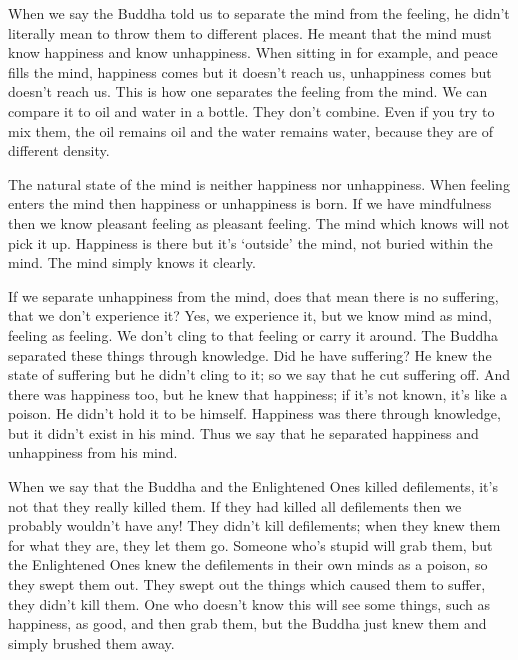 When we say the Buddha told us to separate the mind from the feeling, he didn't literally mean to throw them to different places. He meant that the mind must know happiness and know unhappiness. When sitting in  for example, and peace fills the mind, happiness comes but it doesn't reach us, unhappiness comes but doesn't reach us. This is how one separates the feeling from the mind. We can compare it to oil and water in a bottle. They don't combine. Even if you try to mix them, the oil remains oil and the water remains water, because they are of different density. 

The natural state of the mind is neither happiness nor unhappiness. When feeling enters the mind then happiness or unhappiness is born. If we have mindfulness then we know pleasant feeling as pleasant feeling. The mind which knows will not pick it up. Happiness is there but it's `outside' the mind, not buried within the mind. The mind simply knows it clearly. 

If we separate unhappiness from the mind, does that mean there is no suffering, that we don't experience it? Yes, we experience it, but we know mind as mind, feeling as feeling. We don't cling to that feeling or carry it around. The Buddha separated these things through knowledge. Did he have suffering? He knew the state of suffering but he didn't cling to it; so we say that he cut suffering off. And there was happiness too, but he knew that happiness; if it's not known, it's like a poison. He didn't hold it to be himself. Happiness was there through knowledge, but it didn't exist in his mind. Thus we say that he separated happiness and unhappiness from his mind. 

When we say that the Buddha and the Enlightened Ones killed defilements, it's not that they really killed them. If they had killed all defilements then we probably wouldn't have any! They didn't kill defilements; when they knew them for what they are, they let them go. Someone who's stupid will grab them, but the Enlightened Ones knew the defilements in their own minds as a poison, so they swept them out. They swept out the things which caused them to suffer, they didn't kill them. One who doesn't know this will see some things, such as happiness, as good, and then grab them, but the Buddha just knew them and simply brushed them away. 

